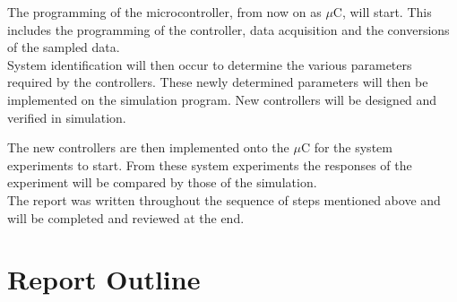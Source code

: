 The programming of the microcontroller, from now on as $\mu$C, will start. This includes the programming of the controller, data acquisition and the conversions of the sampled data.\\

System identification will then occur to determine the various parameters required by the controllers. These newly determined parameters will then be implemented on the simulation program. New controllers will be designed and verified in simulation.

The new controllers are then implemented onto the $\mu$C for the system experiments to start. From these system experiments the responses of the experiment will be compared by those of the simulation.\\

The report was written throughout the sequence of steps mentioned above and will be completed and reviewed at the end.


\section{Report Outline}
